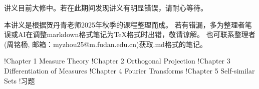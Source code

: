 \theoremstyle{definition}
\newtheorem*{goal}{Goal}

讲义目前大修中。若在此期间发现讲义有明显错误，请耐心等待。

本讲义是根据贺丹青老师2025年秋季的课程整理而成。
若有错漏，多为整理者笔误或AI在调整markdown格式笔记为TeX格式时出错，敬请谅解。
也可联系整理者(周铭杨, 邮箱：myzhou25@m.fudan.edu.cn)获取.md格式的笔记。

\begin{structure}
    \subpage!{\qquad Chapter 1 Measure Theory}
    \subpage!{\qquad Chapter 2 Orthogonal Projection}
    \subpage!{\qquad Chapter 3 Differentiation of Measures}
    \subpage!{\qquad Chapter 4 Fourier Transforms}
    \subpage!{\qquad Chapter 5 Self-similar Sets}
    \subpage!{\qquad 习题}
\end{structure}